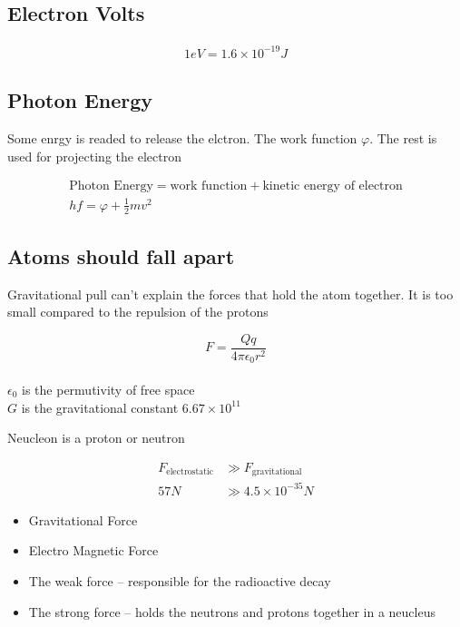 \documentclass{article}
\begin{document}
\subsection{Electron Volts}

\begin{gather}
	1 \si{eV} = 1.6 \times 10 ^{-19} \si {J}
\end{gather}


\subsection{Photon Energy}
Some enrgy is readed to release the elctron. The work function $\varphi$. The rest
is used for projecting the electron

\begin{gather}
	\text{Photon Energy} = \text{work function}
			     + \text{kinetic energy of electron} \\
	hf = \varphi + \frac{1}{2} mv^2
\end{gather}

\subsection{Atoms should fall apart}
Gravitational pull can't explain the forces that hold the atom together.
It is too small compared to the repulsion of the protons


\begin{equation}
	F = \frac{Qq}{4 \pi \epsilon_0 r^2}
\end{equation}
\\
$\epsilon_0$ is the permutivity of free space\\
$G$ is the gravitational constant $6.67 \times 10^{11}$

Neucleon is a proton or neutron

\begin{align}
	F_\text{electrostatic} &\gg F_\text{gravitational} \\
	57 \si{N} &\gg 4.5 \times 10^{-35} \si{N}
\end{align}

\begin{itemize}
	\item Gravitational Force
	\item Electro Magnetic Force
	\item The weak force -- responsible for the radioactive decay
	\item The strong force -- holds the neutrons and protons together in a neucleus
\end{itemize}
\end{document}
